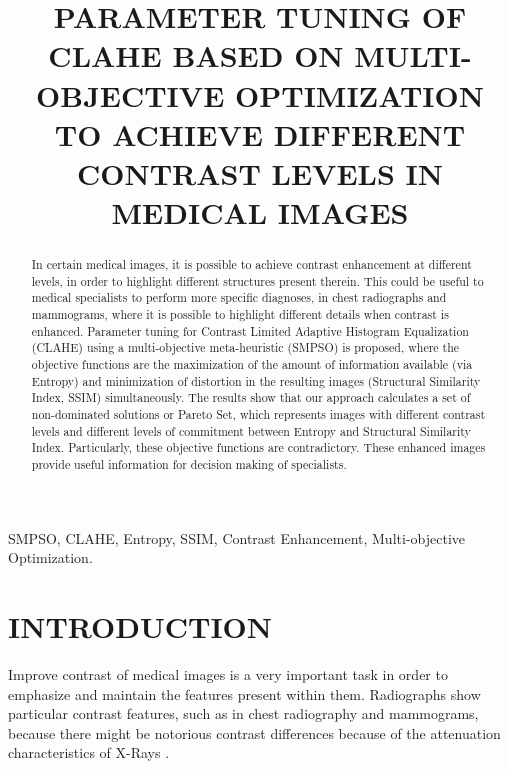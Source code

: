 \documentclass[spanish,twocolumn]{article}
\title{PARAMETER TUNING OF CLAHE BASED ON MULTI-OBJECTIVE OPTIMIZATION TO ACHIEVE DIFFERENT CONTRAST LEVELS IN MEDICAL IMAGES}
\begin{document}
%
\maketitle
%
\begin{abstract}
In certain medical images, it is possible to achieve contrast enhancement at different levels, in order to highlight different structures present therein. This could be useful to medical specialists to perform more specific diagnoses, in chest radiographs and mammograms, where it is possible to highlight different details when contrast is enhanced. Parameter tuning for Contrast Limited Adaptive Histogram Equalization (CLAHE) using a multi-objective meta-heuristic (SMPSO) is proposed, where the objective functions are the maximization of the amount of information available (via Entropy) and minimization of distortion in the resulting images (Structural Similarity Index, SSIM) simultaneously. The results show that our approach calculates a set of non-dominated solutions or Pareto Set, which represents images with different contrast levels and different levels of commitment between Entropy and Structural Similarity Index. Particularly, these objective functions are contradictory. These enhanced images provide useful information for decision making of specialists.

\end{abstract}
%
\begin{keywords}
SMPSO, CLAHE, Entropy, SSIM, Contrast Enhancement, Multi-objective Optimization.
\end{keywords}
%
\section{INTRODUCTION}
\label{sec:intro}

Improve contrast of medical images is a very important task in order to emphasize and maintain the features present within them. Radiographs show particular contrast features, such as in chest radiography and mammograms, because there might be notorious contrast differences because of the attenuation characteristics of X-Rays \cite{chang1998image}. 
\end{document}
